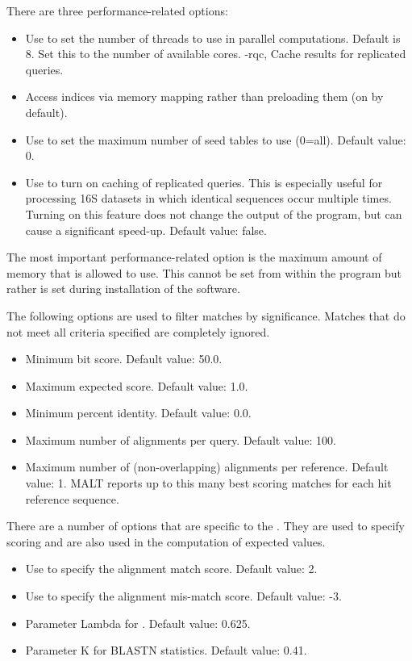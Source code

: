 \documentclass[11pt]{article}
\newcommand\MALT{{\sf MALT}\xspace}
\begin{document}
There are three performance-related options:
\begin{itemize}
\setlength{\itemindent}{30pt}
\item[\itt{--threads}] Use to set the number of threads to use in parallel computations. Default is 8. Set this to
the number of available cores.
	-rqc,           Cache results for replicated queries. 
\item[\itt{--memoryMapping}] Access indices via memory mapping rather than preloading them (on by default).
\item[\itt{--maxTables}] Use to set the maximum number of seed tables to use (0=all). Default value: 0.
\item[\itt{--replicateQueryCache}] Use to turn on caching of replicated queries. This is especially useful for processing 16S datasets
in which identical sequences occur multiple times. Turning on this feature does not change the output of the program, but can
cause a significant speed-up. Default value: false.
\end{itemize}
The most important performance-related option is the maximum amount of memory that 
is allowed to use. This cannot be set from within the program but rather is set during installation of the software.

The following options are used to filter matches by significance. Matches that do not meet all criteria specified are completely ignored.
\begin{itemize}
\setlength{\itemindent}{30pt}
\item[\itt{--minBitScore}]          Minimum bit score. Default value: 50.0.
\item[\itt{--maxExpected}]           Maximum expected score. Default value: 1.0.
\item[{\itt{--minPercentIdentity}}]  Minimum percent identity. Default value: 0.0.
\item[{\itt{--maxAlignmentsPerQuery}}]  Maximum number of alignments per query. Default value: 100.
\item[{\itt{ --maxAlignmentsPerRef}}]   Maximum number of (non-overlapping) alignments  per reference. Default value: 1.
\MALT reports up to this many best scoring matches for each hit reference sequence.
\end{itemize}

{
There are a number of options that are specific to the . They are used to specify scoring and
are also used in the computation of expected values.
\begin{itemize}
\setlength{\itemindent}{30pt}
\item[\itt{--matchScore}]            Use to specify the alignment match score. Default value: 2.
\item[\itt{--mismatchScore}]        Use to specify the alignment mis-match score. Default value: -3.
\item[\itt{--setLambda}]           Parameter Lambda  for . Default value: 0.625.
\item[\itt{--setK}]                   Parameter K  for BLASTN statistics. Default value: 0.41.
\end{itemize}
}
\end{document}
